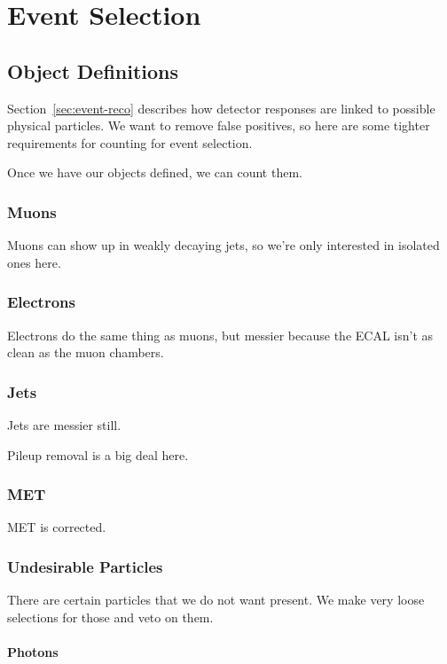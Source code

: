 \chapter{Event Selection}

\section{Object Definitions}

Section~\ref{sec:event-reco} describes how
detector responses are linked to possible physical particles.
We want to remove false positives,
so here are some tighter requirements for counting for event selection.

Once we have our objects defined,
we can count them.

\subsection{Muons}

Muons can show up in weakly decaying jets,
so we're only interested in isolated ones here.

\subsection{Electrons}

Electrons do the same thing as muons,
but messier because the ECAL isn't as clean as the muon chambers.

\subsection{Jets}

Jets are messier still.

Pileup removal is a big deal here.

\subsection{MET}

MET is corrected.

\subsection{Undesirable Particles}

There are certain particles that we do not want present.
We make very loose selections for those and veto on them.

\subsubsection{Photons}

